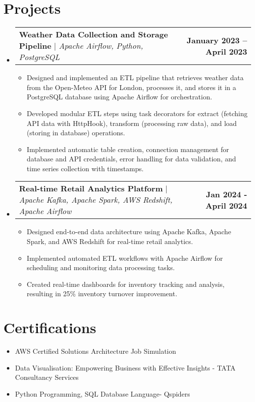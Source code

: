 \documentclass[letterpaper,11pt]{article}
\makeatletter
\newcommand{\resumeItem}[1]{
  \item\small{
    {#1 \vspace{-2pt}}
  }
}
\newcommand{\resumeProjectHeading}[2]{
    \item
    \begin{tabular*}{1.001\textwidth}{l@{\extracolsep{\fill}}r}
      \small#1 & \textbf{\small #2}\\
    \end{tabular*}\vspace{-7pt}
}
\newcommand{\resumeSubHeadingListStart}{\begin{itemize}[leftmargin=0.0in, label={}]}
\newcommand{\resumeSubHeadingListEnd}{\end{itemize}}
\newcommand{\resumeItemListStart}{\begin{itemize}}
\newcommand{\resumeItemListEnd}{\end{itemize}\vspace{-5pt}}
\makeatother
\begin{document}
\section{Projects}
    \vspace{-5pt}
    \resumeSubHeadingListStart
      \resumeProjectHeading
          {\textbf{Weather Data Collection and Storage Pipeline} $|$ \emph{Apache Airflow, Python, PostgreSQL}}{January 2023 -- April 2023}
          \resumeItemListStart
            \resumeItem{Designed and implemented an ETL pipeline that retrieves weather data from the Open-Meteo API for London, processes it, and stores it in a PostgreSQL database using Apache Airflow for orchestration.}
            \resumeItem{Developed modular ETL steps using task decorators for extract (fetching API data with HttpHook), transform (processing raw data), and load (storing in database) operations.}
            \resumeItem{Implemented automatic table creation, connection management for database and API credentials, error handling for data validation, and time series collection with timestamps.}
          \resumeItemListEnd
          \vspace{-5pt}
      \resumeProjectHeading
          {\textbf{Real-time Retail Analytics Platform} $|$ \emph{Apache Kafka, Apache Spark, AWS Redshift, Apache Airflow}}{Jan 2024 - April 2024}
          \resumeItemListStart
            \resumeItem{Designed end-to-end data architecture using Apache Kafka, Apache Spark, and AWS Redshift for real-time retail analytics.}
            \resumeItem{Implemented automated ETL workflows with Apache Airflow for scheduling and monitoring data processing tasks.}
            \resumeItem{Created real-time dashboards for inventory tracking and analysis, resulting in 25\% inventory turnover improvement.}
          \resumeItemListEnd 
    \resumeSubHeadingListEnd
\vspace{-10pt}

\section{Certifications}
    \resumeItemListStart
        \resumeItem{AWS Certified Solutions Architecture Job Simulation}
        \resumeItem{Data Visualisation: Empowering Business with Effective Insights - TATA Consultancy Services}
        \resumeItem{Python Programming, SQL Database Language- Qspiders}
    \resumeItemListEnd
\end{document}
